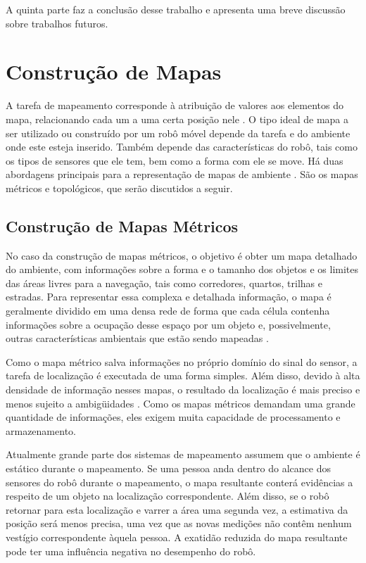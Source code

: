 \documentclass[12pt]{article}
\begin{document}
  A quinta parte faz a conclusão desse trabalho e apresenta uma breve discussão sobre trabalhos futuros.
 
\clearpage
\section{Construção de Mapas}
A tarefa de mapeamento corresponde à atribuição de valores aos elementos do mapa, relacionando cada um a uma certa 
posição nele \cite{construcaoMapas2}. O tipo ideal de mapa
a ser utilizado ou construído por um robô móvel depende da tarefa e do ambiente onde
este esteja inserido. Também depende das características do robô, tais como os tipos
de sensores que ele tem, bem como a forma com ele se move\cite{construcaoMapas2}.  Há duas abordagens principais para a 
representação de mapas de ambiente \cite{construcaoMapas}.
São os mapas métricos e topológicos, que serão discutidos a seguir. 

\subsection{Construção de Mapas Métricos}
No caso da construção de mapas métricos, o objetivo é obter um mapa detalhado do ambiente, 
com informações sobre a forma e o tamanho dos objetos e os limites das
áreas livres para a navegação, tais como corredores, quartos, trilhas e estradas. Para
representar essa complexa e detalhada informação, o mapa é geralmente dividido em
uma densa rede de forma que cada célula contenha informações sobre a ocupação
desse espaço por um objeto e, possivelmente, outras características ambientais que
estão sendo mapeadas \cite{construcaoMapas2}. 

Como o mapa métrico salva informações no próprio domínio do sinal do sensor, a
tarefa de localização é executada de uma forma simples. Além disso, devido à alta
densidade de informação nesses mapas, o resultado da localização é mais preciso e
menos sujeito a ambigüidades \cite{construcaoMapas2}. Como os mapas métricos 
demandam uma grande quantidade de informações, eles exigem muita capacidade de processamento e 
armazenamento.

Atualmente grande parte dos sistemas de mapeamento assumem que o ambiente é estático
durante o mapeamento. Se uma pessoa anda dentro do alcance dos sensores do robô durante o
mapeamento, o mapa resultante conterá evidências a respeito de um objeto na localização
correspondente. Além disso, se o robô retornar para esta localização e varrer a área uma
segunda vez, a estimativa da posição será menos precisa, uma vez que as novas medições não
contêm nenhum vestígio correspondente àquela pessoa. A exatidão reduzida do mapa
resultante pode ter uma influência negativa no desempenho do robô.
\end{document}
